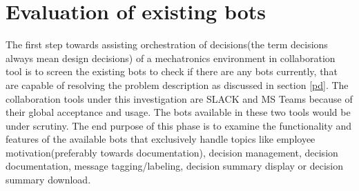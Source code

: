 \chapter{Evaluation of existing bots}
\label{chap: eoeb}
The first step towards assisting orchestration of decisions(the term decisions always mean design decisions) of a mechatronics environment in collaboration tool is to screen the existing bots to check if there are any bots currently, that are capable of resolving the problem description as discussed in section \ref{pd}. The collaboration tools under this investigation are SLACK and MS Teams because of their global acceptance and usage. The bots available in these two tools would be under scrutiny. The end purpose of this phase is to examine the functionality and features of the available bots that exclusively handle topics like employee motivation(preferably towards documentation), decision management, decision documentation, message tagging/labeling, decision summary display or decision summary download.

